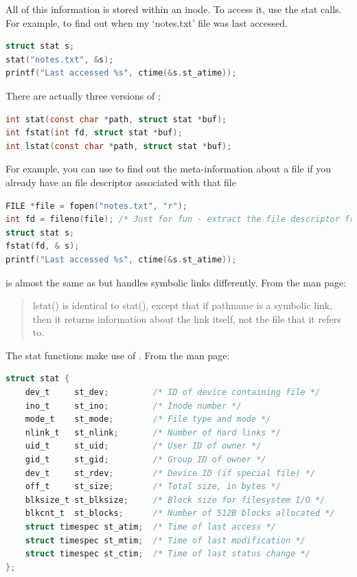 All of this information is stored within an inode. To access it, use the stat calls. For example, to find out when my `notes.txt' file was last accessed.

\begin{lstlisting}[language=C]
struct stat s;
stat("notes.txt", &s);
printf("Last accessed %s", ctime(&s.st_atime));
\end{lstlisting}

There are actually three versions of ;

\begin{lstlisting}[language=C]
int stat(const char *path, struct stat *buf);
int fstat(int fd, struct stat *buf);
int lstat(const char *path, struct stat *buf);
\end{lstlisting}

For example, you can use  to find out the meta-information about a file if you already have an file descriptor associated with that file

\begin{lstlisting}[language=C]
FILE *file = fopen("notes.txt", "r");
int fd = fileno(file); /* Just for fun - extract the file descriptor from a C FILE struct */
struct stat s;
fstat(fd, & s);
printf("Last accessed %s", ctime(&s.st_atime));
\end{lstlisting}

 is almost the same as  but handles symbolic links differently. From the  man page:
\begin{quote}
lstat() is identical to stat(), except that if pathname is a symbolic link, then it returns information about the link itself, not the file that it refers to.
\end{quote}

The stat functions make use of . From the  man page:

\begin{lstlisting}[language=C]
struct stat {
    dev_t     st_dev;         /* ID of device containing file */
    ino_t     st_ino;         /* Inode number */
    mode_t    st_mode;        /* File type and mode */
    nlink_t   st_nlink;       /* Number of hard links */
    uid_t     st_uid;         /* User ID of owner */
    gid_t     st_gid;         /* Group ID of owner */
    dev_t     st_rdev;        /* Device ID (if special file) */
    off_t     st_size;        /* Total size, in bytes */
    blksize_t st_blksize;     /* Block size for filesystem I/O */
    blkcnt_t  st_blocks;      /* Number of 512B blocks allocated */
    struct timespec st_atim;  /* Time of last access */
    struct timespec st_mtim;  /* Time of last modification */
    struct timespec st_ctim;  /* Time of last status change */
};
\end{lstlisting}

